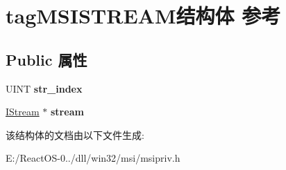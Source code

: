 \hypertarget{structtag_m_s_i_s_t_r_e_a_m}{}\section{tag\+M\+S\+I\+S\+T\+R\+E\+A\+M结构体 参考}
\label{structtag_m_s_i_s_t_r_e_a_m}
\subsection*{Public 属性}
\begin{DoxyCompactItemize}
\item 
\mbox{\label{structtag_m_s_i_s_t_r_e_a_m_a743bce61d69016dbe579491597dc0792}} 
U\+I\+NT {\bfseries str\+\_\+index}
\item 
\mbox{\label{structtag_m_s_i_s_t_r_e_a_m_a968e2687011d0243524758e170e12dce}} 
\hyperlink{interface_i_stream}{I\+Stream} $\ast$ {\bfseries stream}
\end{DoxyCompactItemize}


该结构体的文档由以下文件生成\+:\begin{DoxyCompactItemize}
\item 
E\+:/\+React\+O\+S-\/0../dll/win32/msi/msipriv.\+h\end{DoxyCompactItemize}
